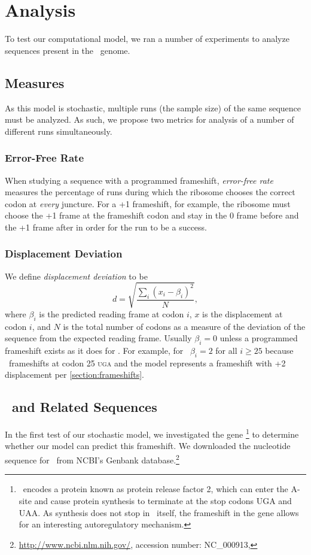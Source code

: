 \documentclass[12pt]{article}
\numberwithin{equation}{section}
\begin{document}
\section{Analysis}
To test our computational model, we ran a number of
experiments to analyze sequences present in the \ecoli\ genome.

\subsection{Measures}
\label{section:metrics}

As this model is stochastic, multiple runs (the sample size) of the same sequence must be analyzed.
As such, we propose two metrics for analysis of a number of different runs 
simultaneously. 

\subsubsection{Error-Free Rate}
\label{section:efr}
When studying a
sequence with a programmed frameshift, \emph{error-free rate} measures the percentage of runs 
during which the ribosome chooses the correct codon
at \emph{every} juncture.  For a +1 frameshift, for example, the ribosome must
choose the +1 frame at the frameshift codon and stay in the 0 frame before
and the +1 frame after in order for the run to be a success.

\subsubsection{Displacement Deviation}
\label{section:deviation}

We define \emph{displacement deviation} to be
\begin{equation}
    d = \sqrt{\frac{\sum_i (x_i - \beta_i)^2}{N}},
\end{equation}
where $\beta_i$ is the predicted reading frame at codon $i$, $x$ is
the displacement at codon $i$, and $N$ is the total number of codons
as a measure of the deviation of the sequence from the expected
reading frame.  Usually $\beta_i = 0$ unless a programmed frameshift
exists as it does for \prfB.  For example, for \prfB\ $\beta_i = 2$
for all $i \geq 25$ because \prfB\ frameshifts at codon 25
\textsc{uga} and the model represents a frameshift with +2
displacement per \autoref{section:frameshifts}.

\subsection{\prfB\ and Related Sequences}
In the first test of our stochastic model, we investigated the
gene \prfB\footnote{\prfB\ encodes a protein known as protein release factor 2,
which can enter the A-site and cause protein synthesis to terminate at the stop 
codons \textsc{UGA} and \textsc{UAA}.  As synthesis does not stop in \prfB\ 
itself, the frameshift in the gene allows for an interesting autoregulatory 
mechanism.} to determine whether our model can predict this frameshift. 
We downloaded the nucleotide sequence for \prfB\ from NCBI's Genbank database.\footnote{\url{http://www.ncbi.nlm.nih.gov/}, accession number: NC\_000913, \prfB}
\end{document}
